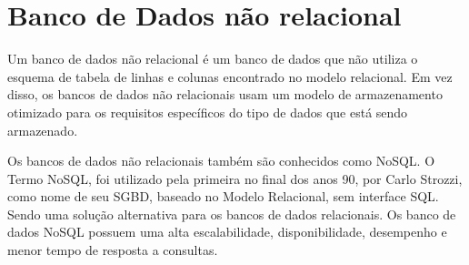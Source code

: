 
\section{Banco de Dados não relacional}
Um banco de dados não relacional é um banco de dados que não utiliza o esquema de tabela de linhas e colunas encontrado no modelo relacional. Em vez disso, os bancos de dados não relacionais usam um modelo de armazenamento otimizado para os requisitos específicos do tipo de dados que está sendo armazenado.

Os bancos de dados não relacionais também são conhecidos como \ac{NoSQL}. O Termo NoSQL, foi utilizado pela primeira no final dos anos 90, por Carlo Strozzi, como nome de seu SGBD, baseado no Modelo Relacional, sem interface SQL. Sendo uma solução alternativa para os bancos de dados relacionais. Os banco de dados \ac{NoSQL} possuem uma alta escalabilidade, disponibilidade,  desempenho e menor tempo de resposta a consultas. \cite{nosqlpramod}


